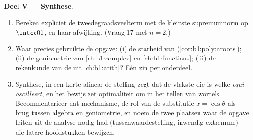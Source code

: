 \begin{problem}
\medskip
\noindent\textbf{Deel V --- Synthese.}
\begin{enumerate}[resume]
  \item Bereken expliciet de  tweedegraadsveelterm met de
        kleinste supremumnorm op $\intcc01$, en haar afwijking. (Vraag
        17 met $n = 2$.)
  \item Waar precies gebruikte de opgave: (i) de starheid van 
        (\cref{cor:b1:poly:nroots}); (ii) de goniometrie van
        \cref{ch:b1:complex} en \cref{ch:b1:functions}; (iii) de
        rekenkunde van de  uit
        \cref{ch:b1:arith}? Eén zin per onderdeel.
  \item Synthese, in een korte alinea: de stelling zegt dat de vlakste
         die is welke \emph{equi-oscilleert}, en het
        bewijs zet optimaliteit om in het tellen van wortels.
        Becommentarieer dat mechanisme, de rol van de substitutie $x =
        \cos\theta$ als brug tussen algebra en goniometrie, en noem de
        twee plaatsen waar de opgave feiten uit de analyse nodig had
        (tussenwaardestelling, inwendig extremum) die latere
        hoofdstukken bewijzen.
\end{enumerate}
\end{problem}
